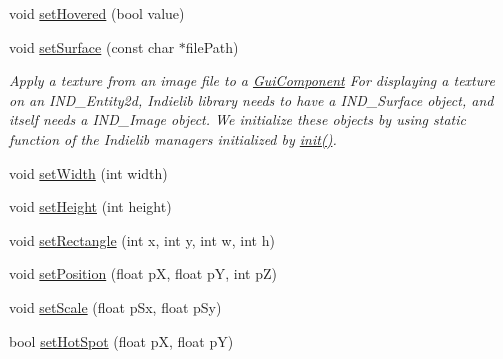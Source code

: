 \begin{DoxyCompactItemize}
void \hyperlink{class_symp_1_1_gui_component_aac319b767afa5a945208c704d3d640ed}{set\-Hovered} (bool value)
\item 
void \hyperlink{class_symp_1_1_gui_component_ab6a2f0f5f43de649f1e50d601518bf1e}{set\-Surface} (const char $\ast$file\-Path)
\begin{DoxyCompactList}\small\item\em Apply a texture from an image file to a \hyperlink{class_symp_1_1_gui_component_a22124675c2976983ac18374f81cc3fb3}{Gui\-Component} For displaying a texture on an I\-N\-D\-\_\-\-Entity2d, Indielib library needs to have a I\-N\-D\-\_\-\-Surface object, and itself needs a I\-N\-D\-\_\-\-Image object. We initialize these objects by using static function of the Indielib managers initialized by \hyperlink{class_symp_1_1_gui_component_a05838e01bbf1e31f292ed4b92a520f20}{init()}. \end{DoxyCompactList}\item 
void \hyperlink{class_symp_1_1_gui_component_a35b54d009eeb7cf4790ca6f33f2d3906}{set\-Width} (int width)
\item 
void \hyperlink{class_symp_1_1_gui_component_a142f827392864e64b77ad02e05575f97}{set\-Height} (int height)
\item 
void \hyperlink{class_symp_1_1_gui_component_a56ec60b13aaf72bee8c3212d89986076}{set\-Rectangle} (int x, int y, int w, int h)
\item 
void \hyperlink{class_symp_1_1_gui_component_ae0939017b02f2aad37375ca2bb25f758}{set\-Position} (float p\-X, float p\-Y, int p\-Z)
\item 
void \hyperlink{class_symp_1_1_gui_component_a71b9ec5dbeb56658e12dc5d3872c5625}{set\-Scale} (float p\-Sx, float p\-Sy)
\item 
bool \hyperlink{class_symp_1_1_gui_component_acdbda4c1c82e319b7b0de755355216a0}{set\-Hot\-Spot} (float p\-X, float p\-Y)
\end{DoxyCompactItemize}
